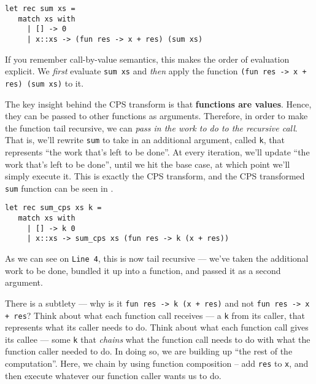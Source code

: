 \begin{code}
\label{code:sum-ocaml}
\begin{verbatim}
let rec sum xs = 
   match xs with
     | [] -> 0
     | x::xs -> (fun res -> x + res) (sum xs)
\end{verbatim}
\end{code}

If you remember call-by-value semantics, this makes the order of evaluation explicit. We \emph{first} evaluate \texttt{sum xs} and \emph{then} apply the function \texttt{(fun res -> x + res) (sum xs)} to it. 

The key insight behind the CPS transform is that \textbf{functions are values}. Hence, they can be passed to other functions as arguments. Therefore, in order to make the function tail recursive, we can \emph{pass in the work to do to the recursive call}. That is, we'll rewrite \texttt{sum} to take in an additional argument, called \texttt{k}, that represents ``the work that's left to be done''. At every iteration, we'll update ``the work that's left to be done'', until we hit the base case, at which point we'll simply execute it. This is exactly the CPS transform, and the CPS transformed \texttt{sum} function can be seen in .

\begin{code}
\label{code:sum-cps-ocaml}
\begin{verbatim}
let rec sum_cps xs k = 
   match xs with
     | [] -> k 0
     | x::xs -> sum_cps xs (fun res -> k (x + res))
\end{verbatim}
\end{code}

As we can see on \texttt{Line 4}, this is now tail recursive --- we've taken the additional work to be done, bundled it up into a function, and passed it as a second argument. 

There is a subtlety --- why is it \texttt{fun res -> k (x + res)} and not \texttt{fun res -> x + res}? Think about what each function call receives --- a \texttt{k} from its caller, that represents what its caller needs to do. Think about what each function call gives its callee --- some \texttt{k} that \emph{chains} what the function call needs to do with what the function caller needed to do. In doing so, we are building up ``the rest of the computation''. Here, we chain by using function composition -- add \texttt{res} to \texttt{x}, and then execute whatever our function caller wants us to do.

